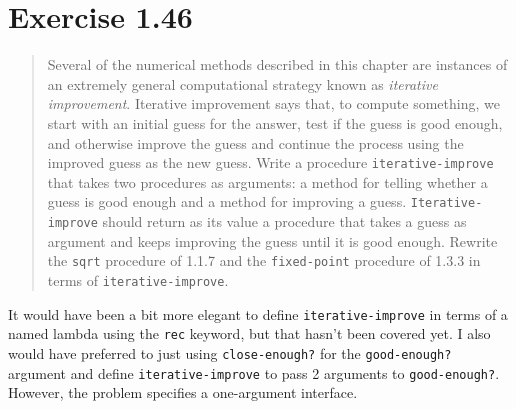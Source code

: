 \documentclass{article}
\begin{document}


\section{Exercise 1.46}
\begin{quote}
    Several of the numerical methods described in this chapter are instances of
    an extremely general computational strategy known as \emph{iterative
    improvement}.  Iterative improvement says that, to compute something, we
    start with an initial guess for the answer, test if the guess is good
    enough, and otherwise improve the guess and continue the process using the
    improved guess as the new guess. Write a procedure
    \texttt{iterative-improve} that takes two procedures as arguments: a method
    for telling whether a guess is good enough and a method for improving a
    guess. \texttt{Iterative-improve} should return as its value a procedure
    that takes a guess as argument and keeps improving the guess until it is
    good enough. Rewrite the \texttt{sqrt} procedure of 1.1.7 and the
    \texttt{fixed-point} procedure of 1.3.3 in terms of
    \texttt{iterative-improve}.
\end{quote}



It would have been a bit more elegant to define \texttt{iterative-improve} in
terms of a named lambda using the \texttt{rec} keyword, but that hasn't been
covered yet. I also would have preferred to just using \texttt{close-enough?}
for the \texttt{good-enough?} argument and define \texttt{iterative-improve} to
pass 2 arguments to \texttt{good-enough?}. However, the problem specifies a
one-argument interface.
\end{document}
